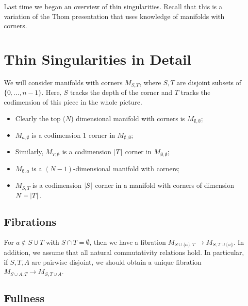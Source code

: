 \documentclass[leqno, openany]{memoir}
\theoremstyle{definition}
\theoremstyle{remark}
\theoremstyle{plain}
\theoremstyle{definition}
\theoremstyle{remark}
\begin{document}
Last time we began an overview of thin singularities. Recall that this is a variation of the Thom presentation that uses knowledge of manifolds with corners.

\section{Thin Singularities in Detail}%
\label{sec:thin_singularities_in_detail}

We will consider manifolds with corners $M_{S,T}$, where $S,T$ are disjoint subsets of $\{0, \ldots, n-1 \}$. Here, $S$ tracks the depth of the corner and $T$ tracks the codimension of this piece in the whole picture. 
\begin{itemize}
    \item Clearly the top ($N$) dimensional manifold with corners is $M_{\emptyset, \emptyset}$; 
    \item $M_{a, \emptyset}$ is a codimension $1$ corner in $M_{\emptyset, \emptyset}$;
    \item Similarly, $M_{T, \emptyset}$ is a codimension $\abs{T}$ corner in $M_{\emptyset, \emptyset}$;
    \item $M_{\emptyset, a}$ is a $(N-1)$-dimensional manifold with corners;
    \item $M_{S,T}$ is a codimension $\abs{S}$ corner in a manifold with corners of dimension $N - \abs{T}$.
\end{itemize}

\subsection{Fibrations}%
\label{sub:fibrations}

For $a \notin S \cup T$ with $S \cap T = \emptyset$, then we have a fibration $M_{S \cup \{a\}, T} \to M_{S, T \cup \{a\}}$. In addition, we assume that all natural commutativity relations hold. In particular, if $S, T, A$ are pairwise disjoint, we should obtain a unique fibration $M_{S \cup A, T} \to M_{S, T \cup A}$.

\subsection{Fullness}%
\label{sub:fullness}
\end{document}
